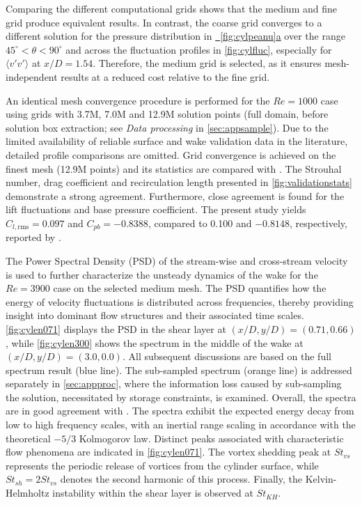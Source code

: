 \documentclass{article}
\newcommand{\subfigref}[2]{\hyperref[#1]{\figureautorefname~\ref*{#1}#2}}
\begin{document}
Comparing the different computational grids shows that the medium and fine grid produce equivalent results. In contrast, the coarse grid converges to a different solution for the pressure distribution in \subfigref{fig:cylpeanu}{a} over the range $45^\circ < \theta < 90^\circ$ and across the fluctuation profiles in \autoref{fig:cylfluc}, especially for $\langle v'v'\rangle$ at $x/D=1.54$. Therefore, the medium grid is selected, as it ensures mesh-independent results at a reduced cost relative to the fine grid. 

An identical mesh convergence procedure is performed for the $Re = 1000$ case using grids with 3.7M, 7.0M and 12.9M solution points \textcolor{revcolor}{(full domain, before solution box extraction; see \textit{Data processing} in \autoref{sec:appsample})}. Due to the limited availability of reliable surface and wake validation data in the literature, detailed profile comparisons are omitted. Grid convergence is achieved on the finest mesh (12.9M points) and its statistics are compared with \citet{Jiang_Cheng_2017}. The Strouhal number, drag coefficient and recirculation length presented in \autoref{fig:validationstats} demonstrate a strong agreement. Furthermore, close agreement is found for the lift fluctuations and base pressure coefficient. The present study yields $C_{l,\mathrm{rms}} = 0.097$ and $C_{pb} = -0.8388$, compared to 0.100 and $-0.8148$, respectively, reported by \citet{Jiang_Cheng_2017}.

The Power Spectral Density (PSD) of the stream-wise and cross-stream velocity is used to further characterize the unsteady dynamics of the wake for the $Re = 3900$ case on the selected medium mesh. The PSD quantifies how the energy of velocity fluctuations is distributed across frequencies, thereby providing insight into dominant flow structures and their associated time scales. \autoref{fig:cylen071} displays the PSD in the shear layer at $(x/D, y/D) = (0.71, 0.66)$, while \autoref{fig:cylen300} shows the spectrum in the middle of the wake at $(x/D, y/D) = (3.0, 0.0)$. All subsequent discussions are based on the full spectrum result (blue line). The sub-sampled spectrum (orange line) is addressed separately in \autoref{sec:appproc}, where the information loss caused by sub-sampling the solution, necessitated by storage constraints, is examined. Overall, the spectra are in good agreement with \citet{lehmkuhl_low-frequency_2013}. The spectra exhibit the expected energy decay from low to high frequency scales, with an inertial range scaling in accordance with the theoretical $-5/3$ Kolmogorov law. Distinct peaks associated with characteristic flow phenomena are indicated in \autoref{fig:cylen071}. The vortex shedding peak at ${St}_{vs}$ represents the periodic release of vortices from the cylinder surface, while ${St}_{sh} = 2{St}_{vs}$ denotes the second harmonic of this process. Finally, the Kelvin-Helmholtz instability within the shear layer is observed at ${St}_{KH}$.
\end{document}
